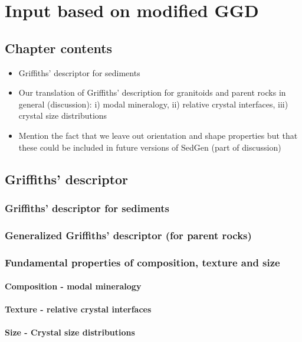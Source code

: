 \chapter{Input based on modified GGD}\label{ch:input_GGD}

\section{Chapter contents}
\begin{itemize}
    \item Griffiths’ descriptor for sediments
    \item Our translation of Griffiths’ description for granitoids and parent rocks in general (discussion): i) modal mineralogy, ii) relative crystal interfaces, iii) crystal size distributions
    \item Mention the fact that we leave out orientation and shape properties but that these could be included in future versions of SedGen (part of discussion)

\end{itemize}

\section{Griffiths' descriptor}

    \subsection{Griffiths' descriptor for sediments}
    \subsection{Generalized Griffiths' descriptor (for parent rocks)}
    \subsection{Fundamental properties of composition, texture and size}

        \subsubsection{Composition - modal mineralogy}
        \subsubsection{Texture - relative crystal interfaces}
        \subsubsection{Size - Crystal size distributions}

